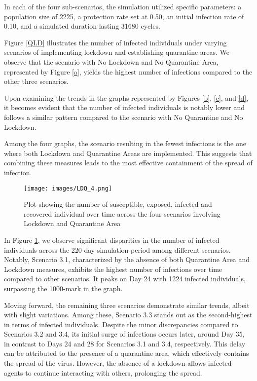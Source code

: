 In each of the four sub-scenarios, the simulation utilized specific parameters: a population size of 2225, a protection rate set at 0.50, an initial infection rate of 0.10, and a simulated duration lasting 31680 cycles.

Figure \ref{QLD} illustrates the number of infected individuals under varying scenarios of implementing lockdown and establishing quarantine areas. We observe that the scenario with No Lockdown and No Quarantine Area, represented by Figure \ref{a}, yields the highest number of infections compared to the other three scenarios.

Upon examining the trends in the graphs represented by Figures \ref{b}, \ref{c}, and \ref{d}, it becomes evident that the number of infected individuals is notably lower and follows a similar pattern compared to the scenario with No Quarantine and No Lockdown.

Among the four graphs, the scenario resulting in the fewest infections is the one where both Lockdown and Quarantine Areas are implemented. This suggests that combining these measures leads to the most effective containment of the spread of infection.



\begin{figure}[H]
	\centering
	\texttt{[image: images/LDQ\_4.png]}
	\caption{Plot showing the number of susceptible, exposed, infected and recovered individual over time across the four scenarios involving Lockdown and Quarantine Area }
	\label{LDQ}
\end{figure} 

In Figure \ref{LDQ}, we observe significant disparities in the number of infected individuals across the 220-day simulation period among different scenarios. Notably, Scenario 3.1, characterized by the absence of both Quarantine Area and Lockdown measures, exhibits the highest number of infections over time compared to other scenarios. It peaks on Day 24 with 1224 infected individuals, surpassing the 1000-mark in the graph. 

Moving forward, the remaining three scenarios demonstrate similar trends, albeit with slight variations. Among these, Scenario 3.3 stands out as the second-highest in terms of infected individuals. Despite the minor discrepancies compared to Scenarios 3.2 and 3.4, its initial surge of infections occurs later, around Day 35, in contrast to Days 24 and 28 for Scenarios 3.1 and 3.4, respectively. This delay can be attributed to the presence of a quarantine area, which effectively contains the spread of the virus. However, the absence of a lockdown allows infected agents to continue interacting with others, prolonging the spread.

